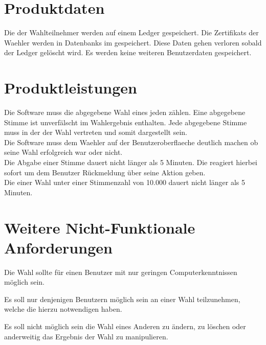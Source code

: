 \documentclass[parskip=full,11pt,twoside]{scrartcl}
\begin{document}
\section{Produktdaten}

Die  der Wahlteilnehmer werden auf einem \gls{Ledger} gespeichert.
Die \glspl{Zertifikat} der \gls{Waehler} werden in \glspl{Datenbank} im  gespeichert.
Diese Daten gehen verloren sobald der \gls{Ledger} gelöscht wird. Es werden keine weiteren \gls{Benutzerdaten} gespeichert.

\section{Produktleistungen}
Die Software muss die abgegebene \gls{Wahl} eines jeden  zählen. Eine abgegebene \gls{Stimme} ist unverfälscht im Wahlergebnis enthalten.
Jede abgegebene \gls{Stimme} muss in der  der \gls{Wahl} vertreten und somit dargestellt sein. \\
Die Software muss dem \gls{Waehler} auf der \gls{Benutzeroberflaeche} deutlich machen ob seine \gls{Wahl} erfolgreich war oder nicht. \\
Die Abgabe einer \gls{Stimme} dauert nicht länger als 5 Minuten.
Die  reagiert hierbei sofort um dem \gls{Benutzer} Rückmeldung über seine Aktion geben. \\
Die  einer \gls{Wahl} unter einer Stimmenzahl von 10.000  dauert nicht länger als 5 Minuten.

\section{Weitere Nicht-Funktionale Anforderungen}

Die \gls{Wahl} sollte für einen \gls{Benutzer} mit nur geringen Computerkenntnissen möglich sein.

Es soll nur denjenigen Benutzern möglich sein an einer \gls{Wahl} teilzunehmen, welche die hierzu notwendigen  haben.

Es soll nicht möglich sein die \gls{Wahl} eines Anderen zu ändern,  zu löschen oder anderweitig das Ergebnis der \gls{Wahl} zu manipulieren.
\end{document}

